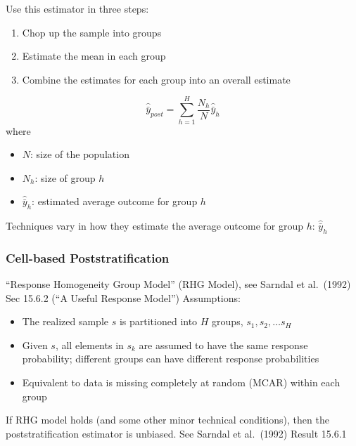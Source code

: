 \documentclass[aspectratio=169]{beamer}
\begin{document}
\begin{frame}

Use this estimator in three steps:
\begin{enumerate}
\item Chop up the sample into groups \pause
\item Estimate the mean in each group \pause
\item Combine the estimates for each group into an overall estimate
\end{enumerate}
\pause

\vfill

\begin{equation*}
\hat{\bar{y}}_{post} = \sum_{h=1}^H \frac{N_h}{N} \hat{\bar{y}}_h
\end{equation*}
where 
\begin{itemize}
\item $N$: size of the population
\item $N_h$: size of group $h$
\item $\hat{\bar{y}}_h$: estimated average outcome for group $h$
\end{itemize}

\vfill
Techniques vary in how they estimate the average outcome for group $h$: $\hat{\bar{y}}_h$
\end{frame}
\begin{frame}
\frametitle{Cell-based Poststratification}

``Response Homogeneity Group Model'' (RHG Model), see Sarndal et al.\ (1992) Sec 15.6.2 (``A Useful Response Model'')
Assumptions:
\begin{itemize}
\item The realized sample $s$ is partitioned into $H$ groups, $s_1, s_2, \ldots s_H$
\item Given $s$, all elements in $s_k$ are assumed to have the same response probability; different groups can have different response probabilities
\item Equivalent to data is missing completely at random (MCAR) within each group
\end{itemize}

\vfill
If RHG model holds (and some other minor technical conditions), then the poststratification estimator is unbiased.  See Sarndal et al.\ (1992) Result 15.6.1 

\end{frame}
\end{document}
